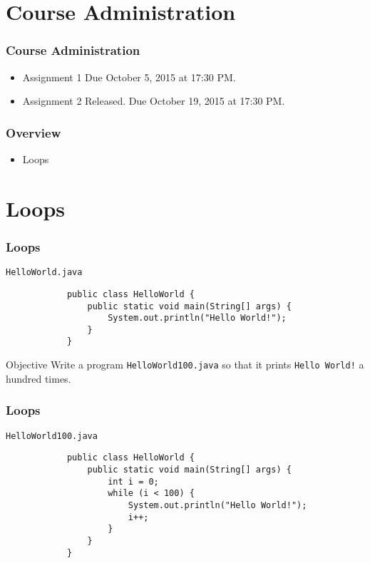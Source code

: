 \documentclass[10pt, compress]{beamer}
\begin{document}
\prepareCover

\section{Course Administration}

\begin{frame}[fragile]
\frametitle{Course Administration}
	\begin{itemize}
		\item[] Assignment 1 Due October 5, 2015 at 17:30 PM.
		\item[] Assignment 2 Released. Due October 19, 2015 at 17:30 PM.
	\end{itemize}
\end{frame}

\begin{frame}[fragile]
	\frametitle{Overview}
	\begin{itemize}
		\item[] Loops
	\end{itemize}
\end{frame}

\section{Loops}

\begin{frame}[fragile]
	\frametitle{Loops}
	\begin{block}{\texttt{HelloWorld.java}}
		\begin{verbatim}
			public class HelloWorld {
			    public static void main(String[] args) {
			        System.out.println("Hello World!");
			    }
			}
		\end{verbatim}
	\end{block}
	\begin{block}{Objective}
		Write a program \texttt{HelloWorld100.java} so that it prints \texttt{Hello World!} a hundred times.
	\end{block}
\end{frame}

\begin{frame}[fragile]
	\frametitle{Loops}
	\begin{block}{\texttt{HelloWorld100.java}}
		\begin{verbatim}
			public class HelloWorld {
			    public static void main(String[] args) {
			        int i = 0;
			        while (i < 100) {
			            System.out.println("Hello World!");
			            i++;
			        }
			    }
			}
		\end{verbatim}
	\end{block}
\end{frame}
\end{document}
